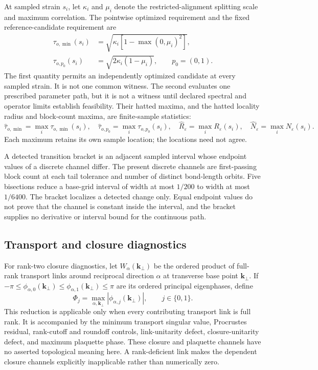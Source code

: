 At sampled strain $s_i$, let $\kappa_i$ and $\mu_i$ denote the restricted-alignment
splitting scale and maximum correlation. The pointwise optimized requirement and the
fixed reference-candidate requirement are
\begin{align}
 \tau_{o,\min}(s_i)
 &=\sqrt{\kappa_i[1-\max(0,\mu_i)^2]},\\
 \tau_{o,p_0}(s_i)
 &=\sqrt{2\kappa_i(1-\mu_i)},
 \qquad p_0=(0,1).
 \label{eq:app-strain-candidate-requirements}
\end{align}
The first quantity permits an independently optimized candidate at every sampled
strain. It is not one common witness. The second evaluates one prescribed parameter
path, but it is not a witness until declared spectral and operator limits establish
feasibility. Their hatted maxima, and the hatted locality radius and block-count maxima,
are finite-sample statistics:
\begin{equation}
 \widehat\tau_{o,\min}=\max_i\tau_{o,\min}(s_i),\quad
 \widehat\tau_{o,p_0}=\max_i\tau_{o,p_0}(s_i),\quad
 \widehat R_\varepsilon=\max_iR_\varepsilon(s_i),\quad
 \widehat N_\varepsilon=\max_iN_\varepsilon(s_i).
 \label{eq:app-strain-sampled-envelopes}
\end{equation}
Each maximum retains its own sample location; the locations need not agree.

A detected transition bracket is an adjacent sampled interval whose endpoint values of
a discrete channel differ. The present discrete channels are first-passing block count
at each tail tolerance and number of distinct bond-length orbits. Five bisections reduce
a base-grid interval of width at most $1/200$ to width at most $1/6400$. The bracket
localizes a detected change only. Equal endpoint values do not prove that the channel is
constant inside the interval, and the bracket supplies no derivative or interval bound
for the continuous path.

\subsection{Transport and closure diagnostics}

For rank-two closure diagnostics, let $W_\alpha(\mathbf k_\perp)$ be the ordered product
of full-rank transport links around reciprocal direction $\alpha$ at transverse base
point $\mathbf k_\perp$. If
$-\pi\le\phi_{\alpha,0}(\mathbf k_\perp)\le
\phi_{\alpha,1}(\mathbf k_\perp)\le\pi$ are its ordered principal eigenphases, define
\begin{equation}
 \Phi_j=\max_{\alpha,\mathbf k_\perp}
 |\phi_{\alpha,j}(\mathbf k_\perp)|,
 \qquad j\in\{0,1\}.
 \label{eq:multidimensional-closure-phase-reduction}
\end{equation}
This reduction is applicable only when every contributing transport link is full rank.
It is accompanied by the minimum transport singular value, Procrustes residual,
rank-cutoff and roundoff controls, link-unitarity defect, closure-unitarity defect, and
maximum plaquette phase. These closure and plaquette channels have no asserted
topological meaning here. A rank-deficient link makes the dependent closure channels
explicitly inapplicable rather than numerically zero.

